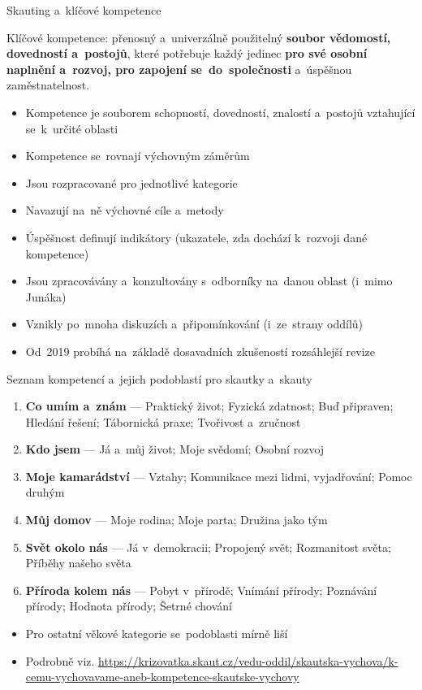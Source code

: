 \documentclass[compress, xelatex, 11pt, xcolor=dvipsnames, aspectratio=169, url={hyphens, lowtilde}]{beamer}
\begin{document}
\begin{frame}{Skauting a~klíčové kompetence}
	\begin{center}
		Klíčové kompetence: přenosný a~univerzálně použitelný \textbf{soubor vědomostí, dovedností a~postojů}, které potřebuje každý jedinec \textbf{pro své osobní naplnění a~rozvoj, pro zapojení se~do~společnosti} a~úspěšnou zaměstnatelnost.
	\end{center}
	\begin{itemize}
		\item Kompetence je souborem schopností, dovedností, znalostí a~postojů vztahující se~k~určité oblasti
		\item Kompetence se~rovnají výchovným záměrům
		\item Jsou rozpracované pro jednotlivé kategorie
		\item Navazují na~ně výchovné cíle a~metody
		\item Úspěšnost definují indikátory (ukazatele, zda dochází k~rozvoji dané kompetence)
		\item Jsou zpracovávány a~konzultovány s~odborníky na~danou oblast (i~mimo Junáka)
		\item Vznikly po~mnoha diskuzích a~připomínkování (i~ze~strany oddílů)
		\item Od~2019 probíhá na~základě dosavadních zkušeností rozsáhlejší revize
	\end{itemize}
\end{frame}

\begin{frame}{Seznam kompetencí a~jejich podoblastí pro skautky a~skauty}
	\begin{enumerate}
		\item \textbf{Co umím a~znám} --- Praktický život; Fyzická zdatnost; Buď připraven; Hledání řešení; Tábornická praxe; Tvořivost a~zručnost
		\item \textbf{Kdo jsem} --- Já a~můj život; Moje svědomí; Osobní rozvoj
		\item \textbf{Moje kamarádství} --- Vztahy; Komunikace mezi lidmi, vyjadřování; Pomoc druhým
		\item \textbf{Můj domov} --- Moje rodina; Moje parta; Družina jako tým
		\item \textbf{Svět okolo nás} --- Já v~demokracii; Propojený svět; Rozmanitost světa; Příběhy našeho světa
		\item \textbf{Příroda kolem nás} --- Pobyt v~přírodě; Vnímání přírody; Poznávání přírody; Hodnota přírody; Šetrné chování
	\end{enumerate}
	\begin{itemize}
		\item Pro ostatní věkové kategorie se~podoblasti mírně liší
		\item Podrobně viz. \url{https://krizovatka.skaut.cz/vedu-oddil/skautska-vychova/k-cemu-vychovavame-aneb-kompetence-skautske-vychovy}
	\end{itemize}
\end{frame}
\end{document}
